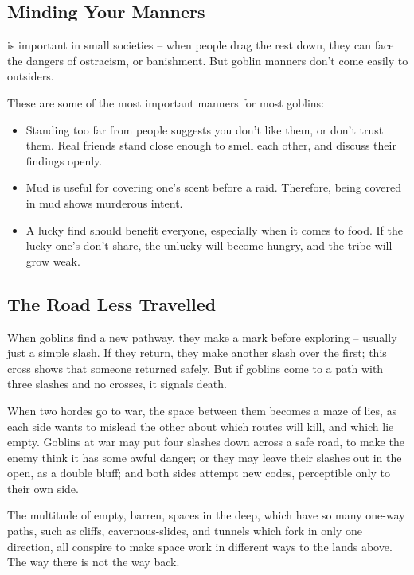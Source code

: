
\begin{multicols}{2}

\subsection{Minding Your Manners}
is important in small societies -- when people drag the rest down, they can face the dangers of ostracism, or banishment.
But goblin manners don't come easily to outsiders.

These are some of the most important manners for most goblins:

\begin{itemize}
  \item
  Standing too far from people suggests you don't like them, or don't trust them.
  Real friends stand close enough to smell each other, and discuss their findings openly.
  \item
  Mud is useful for covering one's scent before a raid.
  Therefore, being covered in mud shows murderous intent.
  \item
  A lucky find should benefit everyone, especially when it comes to food.
  If the lucky one's don't share, the unlucky will become hungry, and the tribe will grow weak.
\end{itemize}

\subsection{The Road Less Travelled}

When goblins find a new pathway, they make a mark before exploring -- usually just a simple slash.
If they return, they make another slash over the first; this cross shows that someone returned safely.
But if goblins come to a path with three slashes and no crosses, it signals death.

When two hordes go to war, the space between them becomes a maze of lies, as each side wants to mislead the other about which routes will kill, and which lie empty.
Goblins at war may put four slashes down across a safe road, to make the enemy think it has some awful danger; or they may leave their slashes out in the open, as a double bluff; and both sides attempt new codes, perceptible only to their own side.

The multitude of empty, barren, spaces in the \gls{deep}, which have so many one-way paths, such as cliffs, cavernous-slides, and tunnels which fork in only one direction, all conspire to make space work in different ways to the lands above.
The way there is not the way back.

\end{multicols}
